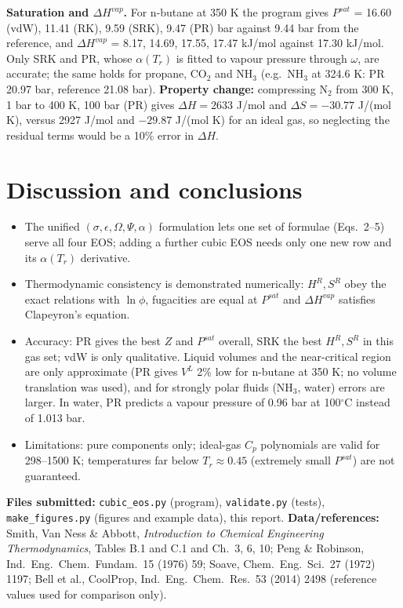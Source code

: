 \documentclass[10pt,a4paper]{article}
\begin{document}
\textbf{Saturation and $\Delta H^{vap}$.} For n-butane at 350 K the program gives $P^{sat}$ = 16.60 (vdW), 11.41 (RK), 9.59 (SRK), 9.47 (PR) bar against 9.44 bar from the reference, and $\Delta H^{vap}$ = 8.17, 14.69, 17.55, 17.47 kJ/mol against 17.30 kJ/mol. Only SRK and PR, whose $\alpha(T_r)$ is fitted to vapour pressure through $\omega$, are accurate; the same holds for propane, CO$_2$ and NH$_3$ (e.g.\ NH$_3$ at 324.6 K: PR 20.97 bar, reference 21.08 bar). \textbf{Property change:} compressing N$_2$ from 300 K, 1 bar to 400 K, 100 bar (PR) gives $\Delta H=2633$ J/mol and $\Delta S=-30.77$ J/(mol K), versus 2927 J/mol and $-29.87$ J/(mol K) for an ideal gas, so neglecting the residual terms would be a 10\% error in $\Delta H$.

\section{Discussion and conclusions}
\begin{itemize}
\item The unified $(\sigma,\epsilon,\Omega,\Psi,\alpha)$ formulation lets one set of formulae (Eqs.~2--5) serve all four EOS; adding a further cubic EOS needs only one new row and its $\alpha(T_r)$ derivative.
\item Thermodynamic consistency is demonstrated numerically: $H^R,S^R$ obey the exact relations with $\ln\phi$, fugacities are equal at $P^{sat}$ and $\Delta H^{vap}$ satisfies Clapeyron's equation.
\item Accuracy: PR gives the best $Z$ and $P^{sat}$ overall, SRK the best $H^R,S^R$ in this gas set; vdW is only qualitative. Liquid volumes and the near-critical region are only approximate (PR gives $V^L$ 2\% low for n-butane at 350 K; no volume translation was used), and for strongly polar fluids (NH$_3$, water) errors are larger. In water, PR predicts a vapour pressure of 0.96 bar at 100$^\circ$C instead of 1.013 bar.
\item Limitations: pure components only; ideal-gas $C_p$ polynomials are valid for 298--1500 K; temperatures far below $T_r\approx0.45$ (extremely small $P^{sat}$) are not guaranteed.
\end{itemize}

\textbf{Files submitted:} \texttt{cubic\_eos.py} (program), \texttt{validate.py} (tests), \texttt{make\_figures.py} (figures and example data), this report. \textbf{Data/references:} Smith, Van Ness \& Abbott, \emph{Introduction to Chemical Engineering Thermodynamics}, Tables B.1 and C.1 and Ch.~3, 6, 10; Peng \& Robinson, Ind.\ Eng.\ Chem.\ Fundam.\ 15 (1976) 59; Soave, Chem.\ Eng.\ Sci.\ 27 (1972) 1197; Bell et al., CoolProp, Ind.\ Eng.\ Chem.\ Res.\ 53 (2014) 2498 (reference values used for comparison only).
\end{document}
